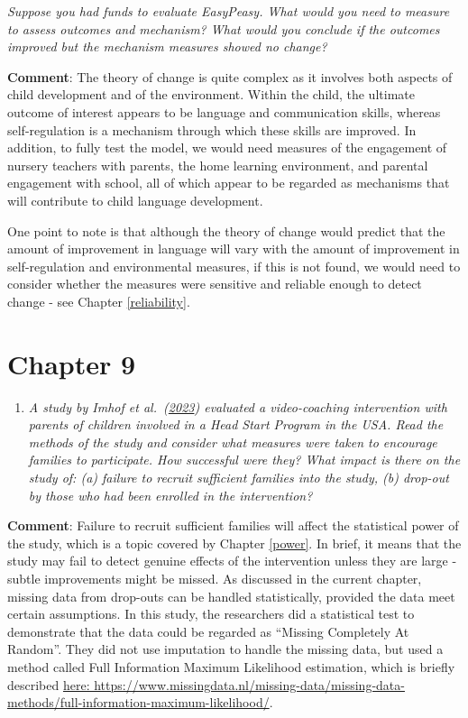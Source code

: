 \documentclass{krantz}
\providecommand{\tightlist}{%
\setlength{\itemsep}{0pt}\setlength{\parskip}{0pt}}
\begin{document}
\emph{Suppose you had funds to evaluate EasyPeasy. What would you need to measure to assess outcomes and mechanism? What would you conclude if the outcomes improved but the mechanism measures showed no change?}

\textbf{Comment}: The theory of change is quite complex as it involves both aspects of child development and of the environment. Within the child, the ultimate outcome of interest appears to be language and communication skills, whereas self-regulation is a mechanism through which these skills are improved. In addition, to fully test the model, we would need measures of the engagement of nursery teachers with parents, the home learning environment, and parental engagement with school, all of which appear to be regarded as mechanisms that will contribute to child language development.

One point to note is that although the theory of change would predict that the amount of improvement in language will vary with the amount of improvement in self-regulation and environmental measures, if this is not found, we would need to consider whether the measures were sensitive and reliable enough to detect change - see Chapter \ref{reliability}.

\hypertarget{chapter-9}{%
\section{Chapter 9}\label{chapter-9}}

\begin{enumerate}
\def\labelenumi{\arabic{enumi}.}
\tightlist
\item
  \emph{A study by Imhof et al.~(\href{file:///Users/dorothybishop/Rprojects/EvaluatingWhatWorks2023/_book/dropouts.html\#ref-imhof2023}{2023}) evaluated a video-coaching intervention with parents of children involved in a Head Start Program in the USA. Read the methods of the study and consider what measures were taken to encourage families to participate. How successful were they? What impact is there on the study of: (a) failure to recruit sufficient families into the study, (b) drop-out by those who had been enrolled in the intervention?}
\end{enumerate}

\textbf{Comment}: Failure to recruit sufficient families will affect the statistical power of the study, which is a topic covered by Chapter \ref{power}. In brief, it means that the study may fail to detect genuine effects of the intervention unless they are large - subtle improvements might be missed. As discussed in the current chapter, missing data from drop-outs can be handled statistically, provided the data meet certain assumptions. In this study, the researchers did a statistical test to demonstrate that the data could be regarded as ``Missing Completely At Random''. They did not use imputation to handle the missing data, but used a method called Full Information Maximum Likelihood estimation, which is briefly described \href{https://www.missingdata.nl/missing-data/missing-data-methods/full-information-maximum-likelihood/}{here: https://www.missingdata.nl/missing-data/missing-data-methods/full-information-maximum-likelihood/}.
\end{document}
